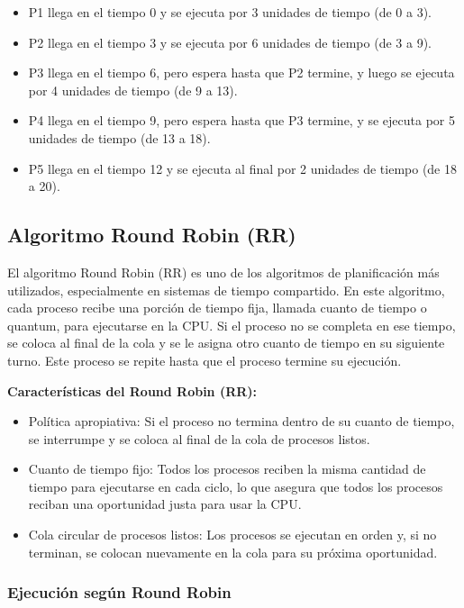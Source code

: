 \begin{itemize}
	\item P1 llega en el tiempo 0 y se ejecuta por 3 unidades de tiempo (de 0 a 3).
	\item 	P2 llega en el tiempo 3 y se ejecuta por 6 unidades de tiempo (de 3 a 9).
	\item 	P3 llega en el tiempo 6, pero espera hasta que P2 termine, y luego se ejecuta por 4 unidades de tiempo (de 9 a 13).
	\item 	
	P4 llega en el tiempo 9, pero espera hasta que P3 termine, y se ejecuta por 5 unidades de tiempo (de 13 a 18).
	\item P5 llega en el tiempo 12 y se ejecuta al final por 2 unidades de tiempo (de 18 a 20).
	
	
\end{itemize}


\subsection{Algoritmo Round Robin (RR)}

El algoritmo Round Robin (RR) es uno de los algoritmos de planificación más utilizados, especialmente en sistemas de tiempo compartido. En este algoritmo, cada proceso recibe una porción de tiempo fija, llamada cuanto de tiempo o quantum, para ejecutarse en la CPU. Si el proceso no se completa en ese tiempo, se coloca al final de la cola y se le asigna otro cuanto de tiempo en su siguiente turno. Este proceso se repite hasta que el proceso termine su ejecución.

\textbf{Características del Round Robin (RR):}
	\begin{itemize} 
		\item Política apropiativa: Si el proceso no termina dentro de su cuanto de tiempo, se interrumpe y se coloca al final de la cola de procesos listos. 
		\item Cuanto de tiempo fijo: Todos los procesos reciben la misma cantidad de tiempo para ejecutarse en cada ciclo, lo que asegura que todos los procesos reciban una oportunidad justa para usar la CPU. 
		\item Cola circular de procesos listos: Los procesos se ejecutan en orden y, si no terminan, se colocan nuevamente en la cola para su próxima oportunidad.
	\end{itemize}

\subsubsection{Ejecución según Round Robin}
	
